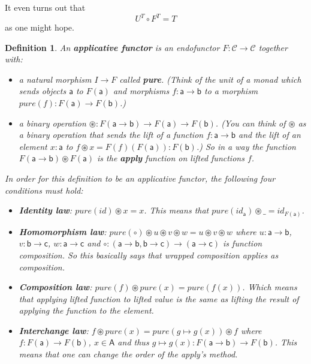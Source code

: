 \documentclass{article}
\newcommand{\cat}[1]{\mathcal{#1}} %
\newcommand{\ob}[1]{\mathsf{#1}} %
\newtheorem{definition}[theorem]{Definition}
\begin{document}
It even turns out that
$$U^T \circ F^T = T$$
as one might hope.

\begin{definition}
	An \textbf{applicative functor} is an endofunctor $F: \cat{C} \rightarrow \cat{C}$ together with:
	\begin{itemize}
		\item a natural morphism $I \rightarrow F$ called \textbf{pure}. (Think of the unit of a monad which sends objects $\ob{a}$ to $F(\ob{a})$ and morphisms $f: \ob{a} \rightarrow \ob{b}$ to a morphism $pure(f): F(\ob{a}) \rightarrow F(\ob{b})$.)
		\item a binary operation $\circledast: F(\ob{a} \rightarrow \ob{b}) \rightarrow F(\ob{a}) \rightarrow F(\ob{b})$. \newline
			  (You can think of $\circledast$ as a binary operation that sends the lift of a function $f: \ob{a} \rightarrow \ob{b}$ and the lift of an element $x: \ob{a}$ to $f \circledast x = F(f)(F(\ob{a})): F(\ob{b})$.) \newline
		      So in a way the function $F(\ob{a} \rightarrow \ob{b}) \circledast F(\ob{a})$ is the \textbf{apply} function on lifted functions $f$.
	\end{itemize}
	In order for this definition to be an applicative functor, the following four conditions must hold:
	\begin{itemize}
		\item \textbf{Identity law}: $pure(id) \circledast x = x$. This means that $pure(id_\ob{a}) \circledast \_ = id_{F(\ob{a})}$.
		\item \textbf{Homomorphism law}: $pure(\circ) \circledast u \circledast v \circledast w = u \circledast v \circledast w$
		      where $u: \ob{a} \rightarrow \ob{b}$, $v: \ob{b} \rightarrow \ob{c}$, $w: \ob{a} \rightarrow \ob{c}$ and $\circ: (\ob{a} \rightarrow \ob{b}, \ob{b} \rightarrow \ob{c}) \rightarrow (\ob{a} \rightarrow \ob{c})$ is function composition.
		      So this basically says that wrapped composition applies as composition.
		\item \textbf{Composition law}: $pure(f) \circledast pure(x) = pure(f(x))$.
		      Which means that applying lifted function to lifted value is the same as lifting the result of applying the function to the element.
		\item \textbf{Interchange law}: $f \circledast pure(x) = pure(g \mapsto g(x)) \circledast f$ where $f: F(\ob{a}) \rightarrow F(\ob{b})$, $x \in \ob{A}$ and thus $g \mapsto g(x): F(\ob{a} \rightarrow \ob{b}) \rightarrow F(\ob{b})$.
		      This means that one can change the order of the apply's method.
	\end{itemize}
\end{definition}
\end{document}
